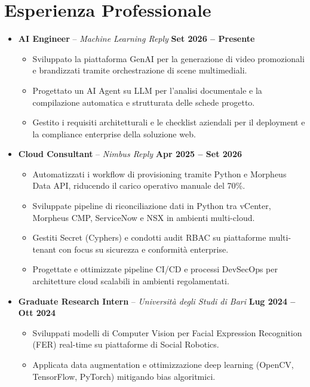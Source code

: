 \documentclass[a4paper,10pt]{article}
\begin{document}
\section{Esperienza Professionale}
\begin{itemize}
    \item \textbf{AI Engineer} -- \textit{Machine Learning Reply} \hfill \textbf{Set 2026 -- Presente}
    \begin{itemize}
        \item Sviluppato la piattaforma GenAI per la generazione di video promozionali e brandizzati tramite orchestrazione di scene multimediali.
        \item Progettato un AI Agent su LLM per l'analisi documentale e la compilazione automatica e strutturata delle schede progetto.
        \item Gestito i requisiti architetturali e le checklist aziendali per il deployment e la compliance enterprise della soluzione web.
    \end{itemize}

    \item \textbf{Cloud Consultant} -- \textit{Nimbus Reply} \hfill \textbf{Apr 2025 -- Set 2026}
    \begin{itemize}
        \item Automatizzati i workflow di provisioning tramite Python e Morpheus Data API, riducendo il carico operativo manuale del 70\%.
        \item Sviluppate pipeline di riconciliazione dati in Python tra vCenter, Morpheus CMP, ServiceNow e NSX in ambienti multi-cloud.
        \item Gestiti Secret (Cyphers) e condotti audit RBAC su piattaforme multi-tenant con focus su sicurezza e conformità enterprise.
        \item Progettate e ottimizzate pipeline CI/CD e processi DevSecOps per architetture cloud scalabili in ambienti regolamentati.
    \end{itemize}

    \item \textbf{Graduate Research Intern} -- \textit{Università degli Studi di Bari} \hfill \textbf{Lug 2024 -- Ott 2024}
    \begin{itemize}
        \item Sviluppati modelli di Computer Vision per Facial Expression Recognition (FER) real-time su piattaforme di Social Robotics.
        \item Applicata data augmentation e ottimizzazione deep learning (OpenCV, TensorFlow, PyTorch) mitigando bias algoritmici.
    \end{itemize}
\end{itemize}
\end{document}

